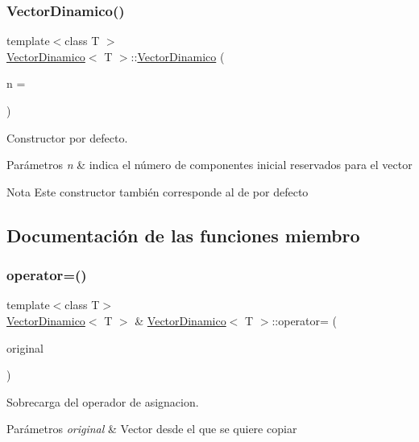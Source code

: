 \subsubsection{\texorpdfstring{Vector\+Dinamico()}{VectorDinamico()}}
{\footnotesize\ttfamily template$<$class T $>$ \\
\hyperlink{classVectorDinamico}{Vector\+Dinamico}$<$ T $>$\+::\hyperlink{classVectorDinamico}{Vector\+Dinamico} (\begin{DoxyParamCaption}\item[{int}]{n = {} }\end{DoxyParamCaption})}



Constructor por defecto. 


\begin{DoxyParams}{Parámetros}
{\em n} & indica el número de componentes inicial reservados para el vector \\
\hline
\end{DoxyParams}
\begin{DoxyNote}{Nota}
Este constructor también corresponde al de por defecto 
\end{DoxyNote}


\subsection{Documentación de las funciones miembro}
\mbox{\label{classVectorDinamico_a94727e698cadc2cf3e8482ce9620df87}} 
\subsubsection{\texorpdfstring{operator=()}{operator=()}}
{\footnotesize\ttfamily template$<$class T$>$ \\
\hyperlink{classVectorDinamico}{Vector\+Dinamico}$<$ T $>$ \& \hyperlink{classVectorDinamico}{Vector\+Dinamico}$<$ T $>$\+::operator= (\begin{DoxyParamCaption}\item[{const \hyperlink{classVectorDinamico}{Vector\+Dinamico}$<$ T $>$ \&}]{original }\end{DoxyParamCaption})}



Sobrecarga del operador de asignacion. 


\begin{DoxyParams}{Parámetros}
{\em original} & Vector desde el que se quiere copiar \\
\hline
\end{DoxyParams}
\mbox{\label{classVectorDinamico_a6c4cab2d396b71939c056fb40ba72951}} 

